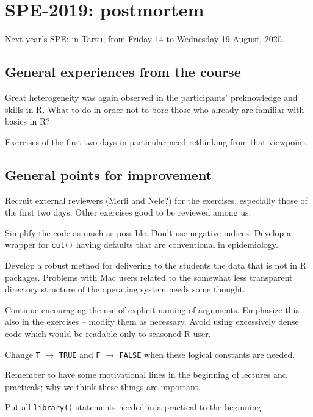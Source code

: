 \parindent0.0cm
\parskip\medskipamount
\baselineskip7mm


\section*{SPE-2019: postmortem}

Next year's SPE: in Tartu, from Friday 14 to Wednesday 19 August, 2020. 

\subsection*{General experiences from the course}

Great heterogeneity was again observed in the participants' preknowledge and skills in R. 
What to do in order not to  bore those who already are familiar with basics in R?

Exercises of the first two days in particular need rethinking from that viewpoint. 

\subsection*{General points for improvement}

Recruit external reviewers (Merli and Nele?) for the exercises, especially those of the first two days.
Other exercises good to be reviewed among us.

Simplify the code as much as possible. Don't use negative indices. 
Develop a wrapper for {\tt cut()} having defaults that are conventional in epidemiology.

Develop a robust method for delivering to the students the data that is not in R packages. Problems with Mac users
related to the somewhat less transparent directory structure of the operating system needs some thought.

Continue encouraging the use of explicit naming of arguments. Emphasize this also in the exercises -- modify them as necessary.
Avoid using excessively dense code which would be readable only to seasoned R user.

Change {\tt T} $\to$ {\tt TRUE} and {\tt F} $\to$ {\tt FALSE} when these logical constants are needed.

Remember to have some motivational lines in the beginning of lectures and practicals; 
why we think these things are important.

Put all {\tt library()} statements needed in a practical to the beginning.

